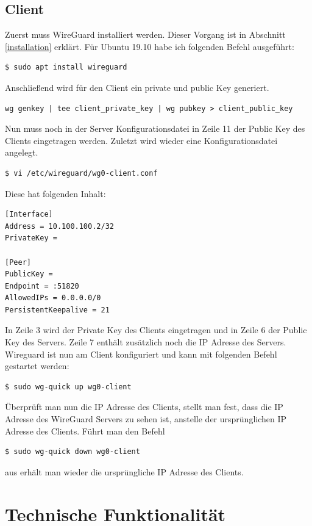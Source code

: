 \subsection{Client}
Zuerst muss WireGuard installiert werden. Dieser Vorgang ist in Abschnitt \ref{installation} erklärt. Für Ubuntu 19.10 habe ich folgenden Befehl ausgeführt:
\begin{lstlisting}
$ sudo apt install wireguard
\end{lstlisting} 
 Anschließend wird für den Client ein private und public Key generiert.
\begin{lstlisting}
wg genkey | tee client_private_key | wg pubkey > client_public_key
\end{lstlisting}
Nun muss noch in der Server Konfigurationsdatei in Zeile 11 der Public Key des Clients eingetragen werden. \newline\newline
Zuletzt wird wieder eine Konfigurationsdatei angelegt.
\begin{lstlisting}
$ vi /etc/wireguard/wg0-client.conf
\end{lstlisting}
Diese hat folgenden Inhalt:
\begin{lstlisting}
[Interface]
Address = 10.100.100.2/32
PrivateKey =

[Peer]
PublicKey =
Endpoint = :51820
AllowedIPs = 0.0.0.0/0
PersistentKeepalive = 21
\end{lstlisting}
In Zeile 3 wird der Private Key des Clients eingetragen und in Zeile 6 der Public Key des Servers. Zeile 7 enthält zusätzlich noch die IP Adresse des Servers. \newline
Wireguard ist nun am Client konfiguriert und kann mit folgenden Befehl gestartet werden:
\begin{lstlisting}
$ sudo wg-quick up wg0-client
\end{lstlisting}
Überprüft man nun die IP Adresse des Clients, stellt man fest, dass die IP Adresse des WireGuard Servers zu sehen ist, anstelle der ursprünglichen IP Adresse des Clients. \newline
Führt man den Befehl
\begin{lstlisting}
$ sudo wg-quick down wg0-client
\end{lstlisting}
aus erhält man wieder die ursprüngliche IP Adresse des Clients.
\newpage
\section{Technische Funktionalität} %

